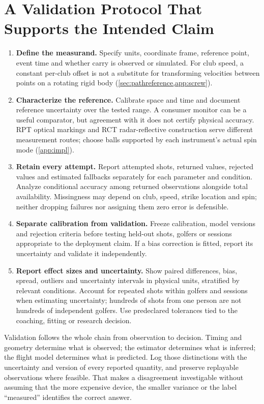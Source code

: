 \section{A Validation Protocol That Supports the Intended Claim}

\begin{enumerate}
\item \textbf{Define the measurand.}
Specify units, coordinate frame, reference point, event time and whether carry is observed or simulated.
For club speed, a constant per-club offset is not a substitute for transforming velocities between points on a rotating rigid body (\cref{sec:pathreference,app:screw}).
\item \textbf{Characterize the reference.}
Calibrate space and time and document reference uncertainty over the tested range.
A consumer monitor can be a useful comparator, but agreement with it does not certify physical accuracy.
RPT optical markings and RCT radar-reflective construction serve different measurement routes; choose balls supported by each instrument's actual spin mode (\cref{app:impl}).
\item \textbf{Retain every attempt.}
Report attempted shots, returned values, rejected values and estimated fallbacks separately for each parameter and condition.
Analyze conditional accuracy among returned observations alongside total availability.
Missingness may depend on club, speed, strike location and spin; neither dropping failures nor assigning them zero error is defensible.
\item \textbf{Separate calibration from validation.}
Freeze calibration, model versions and rejection criteria before testing held-out shots, golfers or sessions appropriate to the deployment claim.
If a bias correction is fitted, report its uncertainty and validate it independently.
\item \textbf{Report effect sizes and uncertainty.}
Show paired differences, bias, spread, outliers and uncertainty intervals in physical units, stratified by relevant conditions.
Account for repeated shots within golfers and sessions when estimating uncertainty; hundreds of shots from one person are not hundreds of independent golfers.
Use predeclared tolerances tied to the coaching, fitting or research decision.
\end{enumerate}

\begin{implication}
Validation follows the whole chain from observation to decision.
Timing and geometry determine what is observed; the estimator determines what is inferred; the flight model determines what is predicted.
Log those distinctions with the uncertainty and version of every reported quantity, and preserve replayable observations where feasible.
That makes a disagreement investigable without assuming that the more expensive device, the smaller variance or the label ``measured'' identifies the correct answer.
\end{implication}
